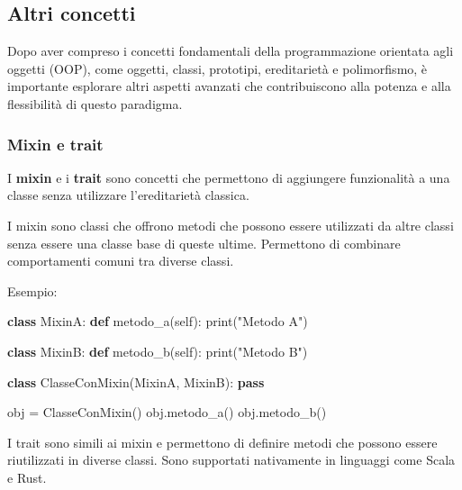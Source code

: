 \documentclass[
  letterpaper,
]{scrbook}
\newenvironment{Shaded}{\begin{snugshade}}{\end{snugshade}}
\newcommand{\BuiltInTok}[1]{\textcolor[rgb]{0.00,0.23,0.31}{#1}}
\newcommand{\ControlFlowTok}[1]{\textcolor[rgb]{0.00,0.23,0.31}{\textbf{#1}}}
\newcommand{\KeywordTok}[1]{\textcolor[rgb]{0.00,0.23,0.31}{\textbf{#1}}}
\newcommand{\NormalTok}[1]{\textcolor[rgb]{0.00,0.23,0.31}{#1}}
\newcommand{\OperatorTok}[1]{\textcolor[rgb]{0.37,0.37,0.37}{#1}}
\newcommand{\StringTok}[1]{\textcolor[rgb]{0.13,0.47,0.30}{#1}}
\newcommand{\VariableTok}[1]{\textcolor[rgb]{0.07,0.07,0.07}{#1}}
\begin{document}
\subsection{Altri concetti}\label{altri-concetti}

Dopo aver compreso i concetti fondamentali della programmazione
orientata agli oggetti (OOP), come oggetti, classi, prototipi,
ereditarietà e polimorfismo, è importante esplorare altri aspetti
avanzati che contribuiscono alla potenza e alla flessibilità di questo
paradigma.

\subsubsection{Mixin e trait}\label{mixin-e-trait}

I \textbf{mixin} e i \textbf{trait} sono concetti che permettono di
aggiungere funzionalità a una classe senza utilizzare l'ereditarietà
classica.

I mixin sono classi che offrono metodi che possono essere utilizzati da
altre classi senza essere una classe base di queste ultime. Permettono
di combinare comportamenti comuni tra diverse classi.

Esempio:

\begin{Shaded}
\begin{Highlighting}[]
\KeywordTok{class}\NormalTok{ MixinA:}
    \KeywordTok{def}\NormalTok{ metodo\_a(}\VariableTok{self}\NormalTok{):}
        \BuiltInTok{print}\NormalTok{(}\StringTok{"Metodo A"}\NormalTok{)}

\KeywordTok{class}\NormalTok{ MixinB:}
    \KeywordTok{def}\NormalTok{ metodo\_b(}\VariableTok{self}\NormalTok{):}
        \BuiltInTok{print}\NormalTok{(}\StringTok{"Metodo B"}\NormalTok{)}

\KeywordTok{class}\NormalTok{ ClasseConMixin(MixinA, MixinB):}
    \ControlFlowTok{pass}

\NormalTok{obj }\OperatorTok{=}\NormalTok{ ClasseConMixin()}
\NormalTok{obj.metodo\_a()}
\NormalTok{obj.metodo\_b()}
\end{Highlighting}
\end{Shaded}

I trait sono simili ai mixin e permettono di definire metodi che possono
essere riutilizzati in diverse classi. Sono supportati nativamente in
linguaggi come Scala e Rust.
\end{document}
